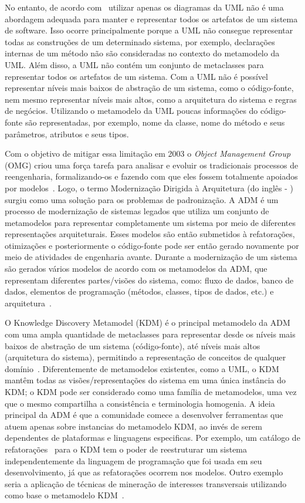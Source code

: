 No entanto, de acordo com~ utilizar apenas os diagramas da UML não é uma abordagem adequada para manter e representar todos os artefatos de um sistema de software. Isso ocorre principalmente porque a UML não consegue representar todas as construções de um determinado sistema, por exemplo, declarações internas de um método não são consideradas no contexto do metamodelo da UML. Além disso, a UML não contém um conjunto de metaclasses para representar todos os artefatos de um sistema. Com a UML não é possível representar níveis mais baixos de abstração de um sistema, como o código-fonte, nem mesmo representar níveis mais altos, como a arquitetura do sistema e regras de negócios. Utilizando o metamodelo da UML poucas informações do código-fonte são representadas, por exemplo, nome da classe, nome do método e seus parâmetros, atributos e seus tipos.  

Com o objetivo de mitigar essa limitação em 2003 o \textit{Object Management Group} (OMG) criou uma força tarefa para analisar e evoluir os tradicionais processos de reengenharia, formalizando-os e fazendo com que eles fossem totalmente apoiados por modelos~\cite{ADM:OMG}. Logo, o termo Modernização Dirigida à Arquitetura (do inglês - ) surgiu como uma solução para os problemas de padronização. A ADM é um processo de modernização de sistemas legados que utiliza um conjunto de metamodelos para representar completamente um sistema por meio de diferentes representações arquiteturais. Esses modelos são então submetidos à refatorações, otimizações e posteriormente o código-fonte pode ser então gerado novamente por meio de atividades de engenharia avante. Durante a modernização de um sistema são gerados vários modelos de acordo com os metamodelos da ADM, que representam diferentes partes/visões do sistema, como: fluxo de dados, banco de dados, elementos de programação (métodos, classes, tipos de dados, etc.) e arquitetura~\cite{PerezCastillo20121370}.

O Knowledge Discovery Metamodel (KDM) é o principal metamodelo da ADM com uma ampla quantidade de metaclasses para representar desde os níveis mais baixos de abstração de um sistema (código-fonte), até níveis mais altos (arquitetura do sistema), permitindo a representação de conceitos de qualquer domínio~\cite{KDM:specification,KDM:ISO}. Diferentemente de metamodelos existentes, como a UML, o KDM mantêm todas as visões/representações do sistema em uma única instância do KDM; o KDM pode ser considerado como uma família de metamodelos, uma vez que o mesmo compartilha a consistência e terminologia homogenia. A ideia principal da ADM é que a comunidade comece a desenvolver ferramentas que atuem apenas sobre instancias do metamodelo KDM, ao invés de serem dependentes de plataformas e linguagens especificas. Por exemplo, um catálogo de refatorações~\cite{durelli_catalogo} para o KDM tem o poder de reestruturar um sistema independentemente da linguagem de programação que foi usada em seu desenvolvimento, já que as refatorações ocorrem nos modelos. Outro exemplo seria a aplicação de técnicas de mineração de interesses transversais utilizando como base o metamodelo KDM~\cite{Durelli:2013_ACM, dani_san, daniel_san_journal}.


